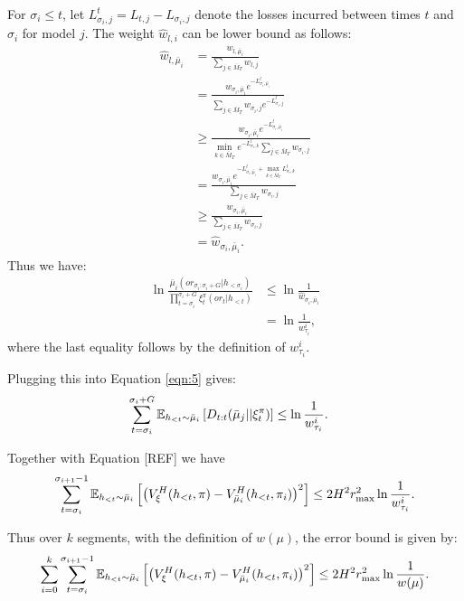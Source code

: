     For $\sigma_i \leq t$, let $L_{\sigma_i, j}^{t} = L_{t, j} - L_{\sigma_i, j}$ denote the losses incurred between times $t$ and $\sigma_i$ for model $j$. The weight $\hat{w}_{l, i}$ can be lower bound as follows:
    \begin{align*}
        \hat{w}_{l, \bar{\mu}_i} &= \frac{w_{l, \bar{\mu}_i}}{\sum_{j \in \bar{M}_T} w_{l, j}}\\
        &= \frac{w_{\sigma_i, \bar{\mu}_i} e^{-L_{\sigma_i, \bar{\mu}_i}^{l}} }{\sum_{j \in \bar{M}_T} w_{\sigma_i, j} e^{-L_{\sigma_i, j}^{l}} }\\
        &\geq \frac{w_{\sigma_i, \bar{\mu}_i} e^{-L_{\sigma_i, \bar{\mu}_i}^{l}} }{ \min_{k \in \bar{M}_T} e^{-L_{\sigma_i, k}^{l}} \sum_{j \in \bar{M}_T} w_{\sigma_i, j} }\\
        &= \frac{w_{\sigma_i, \bar{\mu}_i} e^{-L_{\sigma_i, \bar{\mu}_i}^{l} + \max_{k \in \bar{M}_T} L_{\sigma_i, k}^{l} } }{\sum_{j \in \bar{M}_T} w_{\sigma_i, j} }\\
        &\geq \frac{ w_{\sigma_i, \bar{\mu}_i} }{ \sum_{j \in \bar{M}_T} w_{\sigma_i, j} }\\
        &= \hat{w}_{\sigma_i, \bar{\mu}_i}.
    \end{align*}
    Thus we have:
    \begin{align*}
        \ln \frac{\bar{\mu}_i(or_{\sigma_i: \sigma_i+G} | h_{<\sigma_i})}{\prod_{t = \sigma_i}^{\sigma_i+G} \xi^{\pi}_t(or_t | h_{<t})} &\leq \ln \frac{1}{\hat{w}_{\sigma_i, \bar{\mu}_i}}\\
        &= \ln \frac{1}{w_{\tau_{i}}^{i}},
    \end{align*}
    where the last equality follows by the definition of $w_{\tau_{i}}^{i}$. 

    Plugging this into Equation \ref{eqn:5} gives:
    \begin{align}
        \sum_{t=\sigma_i}^{\sigma_i + G} \mathbb{E}_{h_{<t} \sim \bar{\mu}_i} \left[ D_{t:t}(\bar{\mu}_j || \xi_t^{\pi}) \right] &\leq
        \ln \frac{1}{w_{\tau_{i}}^{i}}.
    \end{align}

    Together with Equation [REF] we have
    \begin{align*}
        \sum_{t = \sigma_i}^{\sigma_{i+1}-1} \mathbb{E}_{h_{<t} \sim \bar{\mu}_i} \left[ \left( V_{\xi}^{H}(h_{<t}, \pi) - V_{\bar{\mu}_i}^{H}(h_{<t}, \pi_i) \right)^2 \right] \leq 2 H^2 r_{\max}^2 \ln \frac{1}{w_{\tau_{i}}^{i}}.
    \end{align*}

    Thus over $k$ segments, with the definition of $w(\mu)$, the error bound is given by:
    \begin{align*}
        \sum_{i=0}^{k} \sum_{t = \sigma_i}^{\sigma_{i+1}-1} \mathbb{E}_{h_{<t} \sim \bar{\mu}_i} \left[ \left( V_{\xi}^{H}(h_{<t}, \pi) - V_{\bar{\mu}_i}^{H}(h_{<t}, \pi_i) \right)^2 \right] \leq 2 H^2 r_{\max}^2 \ln \frac{1}{w(\mu)}.
    \end{align*}

